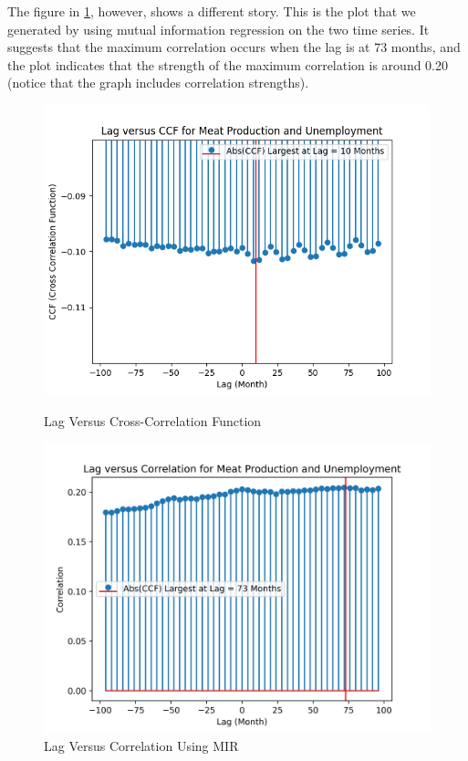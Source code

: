\documentclass[12pt]{article}
\begin{document}
The figure in \ref{fig:lag_mir}, however, shows a different story. This is the plot that we generated by using mutual information regression on the two time series. It suggests that the maximum correlation occurs when the lag is at 73 months, and the plot indicates that the strength of the maximum correlation is around 0.20 (notice that the graph includes correlation strengths).

\begin{figure}[H]
    \centering
    \begin{minipage}{.5\textwidth}
        \centering
        \includegraphics[width=1\linewidth]{images/Lag Correlation Coefficients.png}
        \caption{Lag Versus Cross-Correlation Function}
        \label{fig:lag}
    \end{minipage}
    \begin{minipage}{.5\textwidth}
        \centering
        \includegraphics[width=1\linewidth]{images/Lag Correlation Coefficients - MIR.png}
        \caption{Lag Versus Correlation Using MIR}
        \label{fig:lag_mir}
    \end{minipage}
\end{figure}
\end{document}
